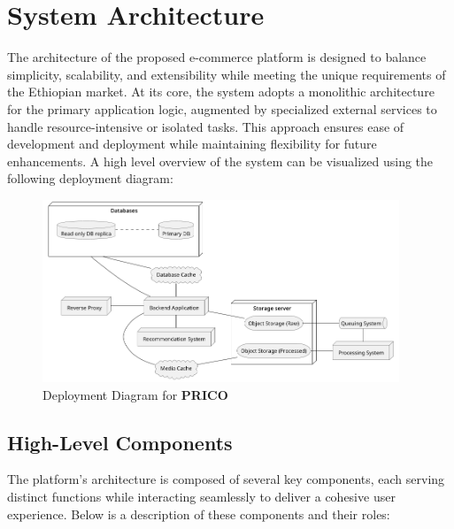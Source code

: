 \documentclass[12pt]{report}
\begin{document}
\section{System Architecture}

The architecture of the proposed e-commerce platform is designed to balance simplicity,
scalability, and extensibility while meeting the unique requirements of the Ethiopian market.
At its core, the system adopts a monolithic architecture for the primary application logic,
augmented by specialized external services to handle resource-intensive or isolated tasks.
This approach ensures ease of development and deployment while maintaining flexibility for
future enhancements. A high level overview of the system can be visualized using the
following deployment diagram:


\begin{figure}[H]
	\begin{center}
		\includegraphics[width=0.95\textwidth]{diagrams/deployment}
	\end{center}
	\caption{Deployment Diagram for \textbf{PRICO}}
\end{figure}

\subsection{High-Level Components}

The platform’s architecture is composed of several key components, each serving distinct
functions while interacting seamlessly to deliver a cohesive user experience. Below is a
description of these components and their roles:
\end{document}
